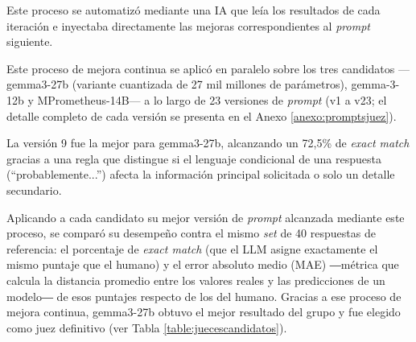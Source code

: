 Este proceso se automatizó mediante una IA que leía los resultados de cada iteración e inyectaba directamente las mejoras correspondientes al \textit{prompt} siguiente.

Este proceso de mejora continua se aplicó en paralelo sobre los tres candidatos —gemma3-27b (variante cuantizada de 27 mil millones de parámetros), gemma-3-12b y MPrometheus-14B— a lo largo de 23 versiones de \textit{prompt} (v1 a v23; el detalle completo de cada versión se presenta en el Anexo \ref{anexo:promptsjuez}).

La versión 9 fue la mejor para gemma3-27b, alcanzando un 72,5\% de \textit{exact match} gracias a una regla que distingue si el lenguaje condicional de una respuesta (``probablemente...'') afecta la información principal solicitada o solo un detalle secundario.

Aplicando a cada candidato su mejor versión de \textit{prompt} alcanzada mediante este proceso, se comparó su desempeño contra el mismo \textit{set} de 40 respuestas de referencia: el porcentaje de \textit{exact match} (que el LLM asigne exactamente el mismo puntaje que el humano) y el error absoluto medio (MAE) ―métrica que calcula la distancia promedio entre los valores reales y las predicciones de un modelo― de esos puntajes respecto de los del humano. Gracias a ese proceso de mejora continua, gemma3-27b obtuvo el mejor resultado del grupo y fue elegido como juez definitivo (ver Tabla \ref{table:juecescandidatos}).

